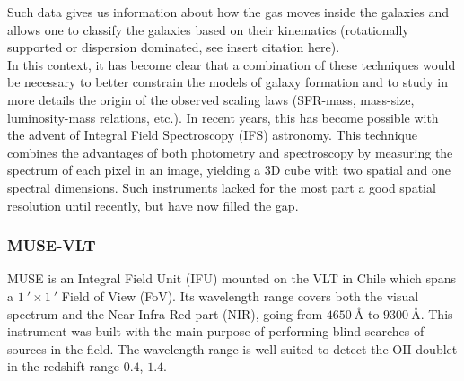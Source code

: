 Such data gives us information about how the gas moves inside the galaxies and allows one to classify the galaxies based on their kinematics (rotationally supported or dispersion dominated, see insert citation here). \\

In this context, it has become clear that a combination of these techniques would be necessary to better constrain the models of galaxy formation and to study in more details the origin of the observed scaling laws (SFR-mass, mass-size, luminosity-mass relations, etc.). In recent years, this has become possible with the advent of Integral Field Spectroscopy (IFS) astronomy. This technique combines the advantages of both photometry and spectroscopy by measuring the spectrum of each pixel in an image, yielding a 3D cube with two spatial and one spectral dimensions. Such instruments lacked for the most part a good spatial resolution until recently, but have now filled the gap. \\

\subsubsection{MUSE-VLT}
\label{subsubsec:MUSE-VLT}

MUSE is an Integral Field Unit (IFU) mounted on the VLT in Chile which spans a $\SI{1}{\arcmin} \times \SI{1}{\arcmin}$ Field of View (FoV). Its wavelength range covers both the visual spectrum and the Near Infra-Red part (NIR), going from $\SI{4650}{\angstrom}$ to $\SI{9300}{\angstrom}$. This instrument was built with the main purpose of performing blind searches of sources in the field. The wavelength range is well suited to detect the OII doublet in the redshift range $0.4$, $1.4$.